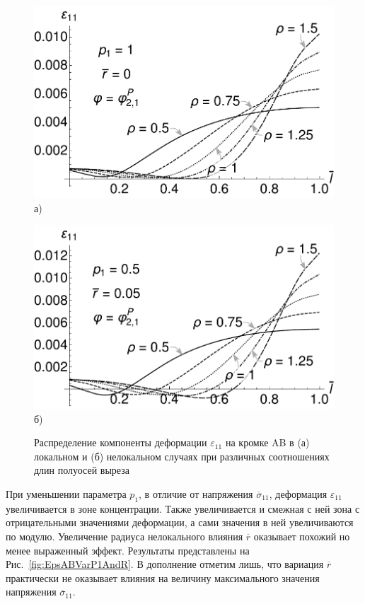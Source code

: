 \begin{figure}[ht]
    \begin{minipage}[b][][b]{0.49\linewidth}\centering
        \includegraphics[width=\linewidth]{pics/KirshABEps11Local.pdf} \\ а)
    \end{minipage}
    \hfill
    \begin{minipage}[b][][b]{0.49\linewidth}\centering
        \includegraphics[width=\linewidth]{pics/KirshABEps11r005p05.pdf} \\ б)
    \end{minipage}
    \caption{Распределение компоненты деформации $\varepsilon_{11}$ на кромке AB в (а) локальном и (б) нелокальном случаях при различных соотношениях длин полуосей выреза}
    \label{fig:EpsABLocAndNonloc}
\end{figure}

При уменьшении параметра $p_1$, в отличие от напряжения $\overline{\sigma}_{11}$, деформация $\varepsilon_{11}$ увеличивается в зоне концентрации. Также увеличивается и смежная с ней зона с отрицательными значениями деформации, а сами значения в ней увеличиваются по модулю. Увеличение радиуса нелокального влияния $\overline{r}$ оказывает похожий  но менее выраженный эффект. Результаты представлены на Рис.~\ref{fig:EpsABVarP1AndR}. В дополнение отметим лишь, что вариация $\overline{r}$ практически не оказывает влияния на величину максимального значения напряжения $\overline{\sigma}_{11}$.

